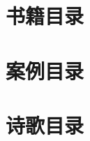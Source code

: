 \documentclass{ctexart}
\begin{document}
\setcounter{tocdepth}{4}
\renewcommand*{\contentsname}{}
\begin{multicols}{2}
    \tableofcontents
\end{multicols}

\section{书籍目录}
\renewcommand*{\listtheoremname}{}
\begin{multicols}{2}
    \listoftheorems[ignoreall, show = book]
\end{multicols}

\section{案例目录}
\renewcommand*{\listtheoremname}{}
\begin{multicols}{2}
    \listoftheorems[ignoreall, show = case]
\end{multicols}

\section{诗歌目录}
\renewcommand*{\listtheoremname}{}
\begin{multicols}{2}
    \listoftheorems[ignoreall, show = poem]
\end{multicols}
\end{document}
